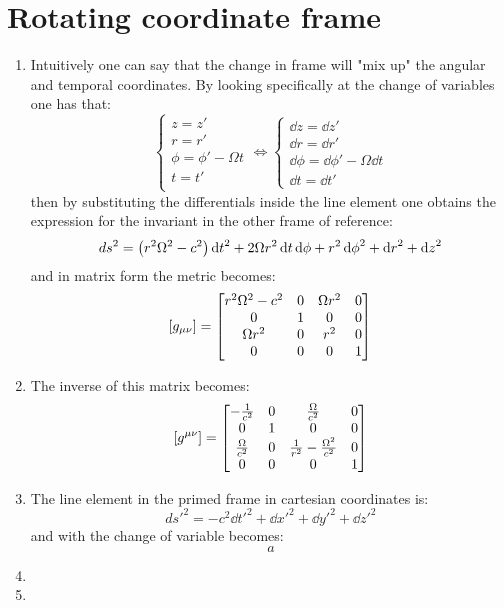 \documentclass[11pt, oneside]{article}
\begin{document}
\section{Rotating coordinate frame}
\begin{enumerate}
\item Intuitively one can say that the change in frame will "mix up" the angular and temporal coordinates. By looking specifically at the change of variables one has that:
\[
	\begin{cases}
		z = z' \\
		r = r' \\
		\phi = \phi' - \Omega t \\
		t = t' \\ 
	\end{cases}
	\iff
	\begin{cases}
		\dd{z} = \dd{z'} \\
		\dd{r} = \dd{r'} \\
		\dd{\phi} = \dd{\phi'} - \Omega \dd{t} \\
		\dd{t} = \dd{t'}
	\end{cases}
\]
then by substituting the differentials inside the line element one obtains the expression for the invariant in the other frame of reference:
\[
	d s^2 = \qty(r^2\Omega^2 - c^2) \dd{t}^2 + 2\Omega r^2 \dd{t} \dd{\phi}+ r^2 \dd{\phi}^2 + \dd{r}^2 + \dd{z}^2
\]
and in matrix form the metric becomes:
\[
	\qty[g_{\mu\nu}] = 
	\begin{bmatrix}
		r^2\Omega^2 - c^2 & 0 &\Omega r^2 & 0 \\
		0 & 1 & 0 & 0 \\
		\Omega r^2 & 0 & r^2 & 0 \\
		0 & 0 & 0 & 1 \\
	\end{bmatrix}
\]

\item The inverse of this matrix becomes:
\[
	\qty[g^{\mu\nu}] = 
	\begin{bmatrix}
		-\frac{1}{c^{2}} & 0 & \frac{\Omega}{c^{2}} & 0 \\
		0 & 1 & 0 & 0 \\
		\frac{\Omega}{c^{2}} & 0 & \frac{1}{r^{2}} -\frac{\Omega^{2}}{c^{2}} & 0 \\
		0 & 0 & 0 & 1
	\end{bmatrix}
\]

\item The line element in the primed frame in cartesian coordinates is:
\[
	ds'^2 = -c^2\dd{t}'^2 + \dd{x}'^2 + \dd{y} '^2 + \dd{z}'^2
\]
and with the change of variable becomes:
\[
	a
\]


\item


\item


\end{enumerate}
\end{document}
